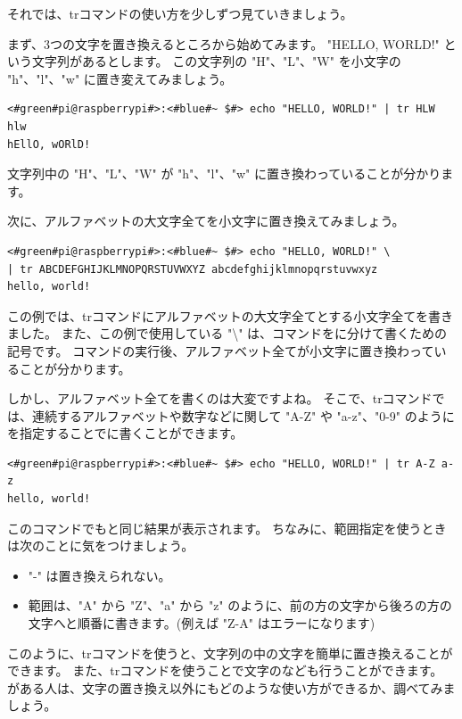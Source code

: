 \documentclass[text03.tex]{subfiles}
\begin{document}
それでは、trコマンドの使い方を少しずつ見ていきましょう。

まず、3つの文字を置き換えるところから始めてみます。
"HELLO, WORLD!" という文字列があるとします。
この文字列の "H"、"L"、"W" を小文字の "h"、"l"、"w" に置き変えてみましょう。
\begin{lstlisting}[caption=3文字の置き換え, label=tr_3_chars]
<#green#pi@raspberrypi#>:<#blue#~ $#> echo "HELLO, WORLD!" | tr HLW hlw
hEllO, wORlD!
\end{lstlisting}
文字列中の "H"、"L"、"W" が "h"、"l"、"w" に置き換わっていることが分かります。

次に、アルファベットの大文字全てを小文字に置き換えてみましょう。
\begin{lstlisting}[caption=アルファベット全体の置き換え, label=tr_all_chars]
<#green#pi@raspberrypi#>:<#blue#~ $#> echo "HELLO, WORLD!" \
| tr ABCDEFGHIJKLMNOPQRSTUVWXYZ abcdefghijklmnopqrstuvwxyz
hello, world!
\end{lstlisting}
この例では、trコマンドにアルファベットの大文字全てとする小文字全てを書きました。
また、この例で使用している "\textbackslash" は、コマンドをに分けて書くための記号です。
コマンドの実行後、アルファベット全てが小文字に置き換わっていることが分かります。

しかし、アルファベット全てを書くのは大変ですよね。
そこで、trコマンドでは、連続するアルファベットや数字などに関して "A-Z" や "a-z"、"0-9"
のようにを指定することでに書くことができます。

\begin{lstlisting}[caption=範囲指定を使った置き換え, label=tr_range]
<#green#pi@raspberrypi#>:<#blue#~ $#> echo "HELLO, WORLD!" | tr A-Z a-z
hello, world!
\end{lstlisting}
このコマンドでもと同じ結果が表示されます。
ちなみに、範囲指定を使うときは次のことに気をつけましょう。
\begin{itemize}
    \item "-" は置き換えられない。
    \item 範囲は、"A" から "Z"、"a" から "z" のように、前の方の文字から後ろの方の文字へと順番に書きます。(例えば "Z-A"
          はエラーになります)
\end{itemize}
このように、trコマンドを使うと、文字列の中の文字を簡単に置き換えることができます。
また、trコマンドを使うことで文字のなども行うことができます。
がある人は、文字の置き換え以外にもどのような使い方ができるか、調べてみましょう。
\end{document}
